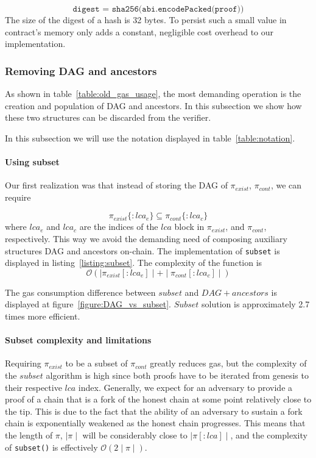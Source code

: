 \[\texttt{digest = sha256(abi.encodePacked(proof))}\] The size of the digest of
a hash is 32 bytes. To persist such a small value in contract's memory only
adds a constant, negligible cost overhead to our implementation.



\subsubsection{Removing DAG and ancestors}

As shown in table~\ref{table:old_gas_usage}, the most demanding operation is
the creation and population of DAG and ancestors. In this subsection we show
how these two structures can be discarded from the verifier.

In this subsection we will use the notation displayed in
table~\ref{table:notation}.



\paragraph{Using subset} Our first realization was that instead of storing the
DAG of $\pi_{exist}$, $\pi_{cont}$, we can require

\[ \pi_{exist}\{:lca_{e}\} \subseteq \pi_{cont}\{:lca_{c}\} \]
where $lca_{e}$ and $lca_{c}$ are the indices of the $lca$ block in
$\pi_{exist}$, and $\pi_{cont}$, respectively. This way we avoid
the demanding need of composing auxiliary structures DAG and ancestors
on-chain. The implementation of \texttt{subset} is displayed in
listing~\ref{listing:subset}. The complexity of the function is
\[ \mathcal{O}(\mid\pi_{exist}[:lca_{e}]\mid + \mid\pi_{cont}[:lca_{c}]\mid) \]





The gas consumption difference between $subset$ and $DAG + ancestors$ is
displayed at figure~\ref{figure:DAG_vs_subset}. $Subset$ solution is
approximately 2.7 times more efficient.



\paragraph{Subset complexity and limitations} Requiring $\pi_{exist}$ to be a subset of
$\pi_{cont}$ greatly reduces gas, but the complexity of the $subset$ algorithm
is high since both proofs have to be iterated from genesis to their respective
$lca$ index. Generally, we expect for an adversary to provide a proof of a
chain that is a fork of the honest chain at some point relatively close to the
tip. This is due to the fact that the ability of an adversary to sustain a fork
chain is exponentially weakened as the honest chain progresses.  This means
that the length of $\pi$, $\mid\pi\mid$ will be considerably close to
$\mid\pi[:lca]\mid$, and the complexity of \texttt{subset()} is effectively
$\mathcal{O}(2\mid\pi\mid)$.

